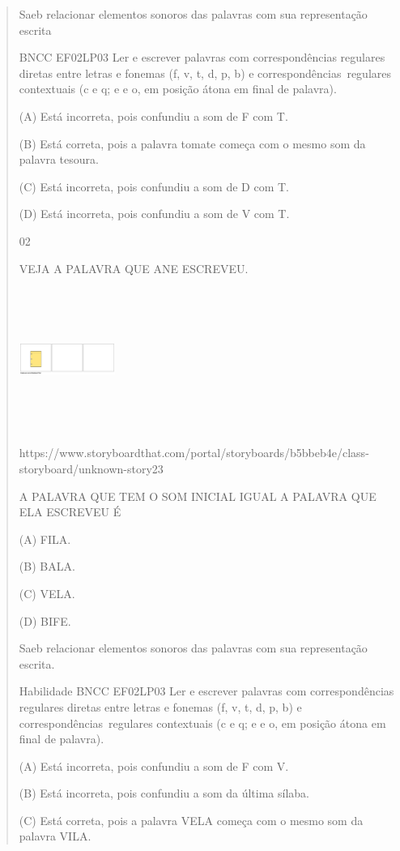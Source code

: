 \begin{verse}
{{{{{{{{{{{{{{{{{{{{Saeb relacionar elementos sonoros das palavras com sua representação
escrita

BNCC EF02LP03 Ler e escrever palavras com correspondências regulares
diretas entre letras e fonemas (f, v, t, d, p, b) e
correspondências~regulares contextuais (c e q; e e o, em posição átona
em final de palavra).

(A) Está incorreta, pois confundiu a som de F com T.

(B) Está correta, pois a palavra tomate começa com o mesmo som da
palavra tesoura.

(C) Está incorreta, pois confundiu a som de D com T.

(D) Está incorreta, pois confundiu a som de V com T.

\num{02}

VEJA A PALAVRA QUE ANE ESCREVEU.

\includegraphics[width=1.22986in,height=1.82986in]{media/image164.png}

https://www.storyboardthat.com/portal/storyboards/b5bbeb4e/class-storyboard/unknown-story23

A PALAVRA QUE TEM O SOM INICIAL IGUAL A PALAVRA QUE ELA ESCREVEU É

(A) FILA.

(B) BALA.

(C) VELA.

(D) BIFE.

Saeb relacionar elementos sonoros das palavras com sua representação
escrita.

Habilidade BNCC EF02LP03 Ler e escrever palavras com correspondências
regulares diretas entre letras e fonemas (f, v, t, d, p, b) e
correspondências~regulares contextuais (c e q; e e o, em posição átona
em final de palavra).

(A) Está incorreta, pois confundiu a som de F com V.

(B) Está incorreta, pois confundiu a som da última sílaba.

(C) Está correta, pois a palavra VELA começa com o mesmo som da palavra
VILA.

}}}}}}}}}}}}}}}}}}}}
\end{verse}
